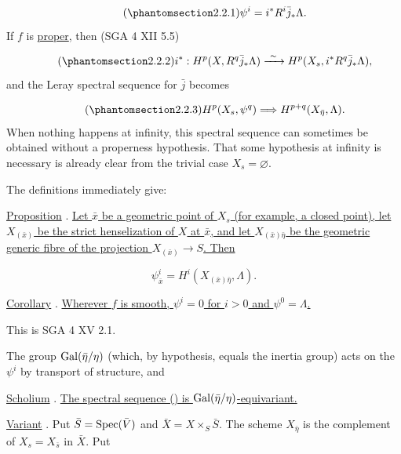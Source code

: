 \begin{equation*}\tag{\SGARefTarget{sga7.sga7i.ei.n2-2-1}{2.2.1}}
\psi^i=i^*R^i\bar j_*\Lambda.
\end{equation*}
If $f$ is \underline{proper}, then (SGA 4 XII 5.5)

\begin{equation*}\tag{\SGARefTarget{sga7.sga7i.ei.n2-2-2}{2.2.2}}
i^*:H^p(X,R^q\bar j_*\Lambda)\xrightarrow{\ \sim\ }
H^p(X_s,i^*R^q\bar j_*\Lambda),
\end{equation*}
and the Leray spectral sequence for $\bar j$ becomes

\begin{equation*}\tag{\SGARefTarget{sga7.sga7i.ei.n2-2-3}{2.2.3}}
H^p(X_s,\psi^q)\Longrightarrow H^{p+q}(X_{\bar\eta},\Lambda).
\end{equation*}
When nothing happens at infinity, this spectral sequence can sometimes be obtained without a properness hypothesis. That some hypothesis at infinity is necessary is already clear from the trivial case $X_s=\varnothing$.


The definitions immediately give:

\underline{Proposition} . \underline{Let $\bar x$ be a geometric point of $X_s$ (for example, a closed point), let $X_{(\bar x)}$ be the strict henselization of $X$ at $\bar x$, and let $X_{(\bar x)\bar\eta}$ be the geometric generic fibre of the projection $X_{(\bar x)}\longrightarrow S$. Then}

\begin{equation*}
\psi^i_{\bar x}=H^i(X_{(\bar x)\bar\eta},\Lambda).
\end{equation*}

\underline{Corollary} . \underline{Wherever $f$ is smooth, $\psi^i=0$ for $i>0$ and $\psi^0=\Lambda$.}

This is SGA 4 XV 2.1.

The group $\operatorname{Gal}(\bar\eta/\eta)$ (which, by hypothesis, equals the inertia group) acts on the $\psi^i$ by transport of structure, and

\underline{Scholium} . \underline{The spectral sequence () is $\operatorname{Gal}(\bar\eta/\eta)$-equivariant.}

\underline{Variant} . Put $\bar S=\operatorname{Spec}(\bar V)$ and $\bar X=X\times_S\bar S$. The scheme $X_{\bar\eta}$ is the complement of $X_s=X_{\bar s}$ in $\bar X$. Put

